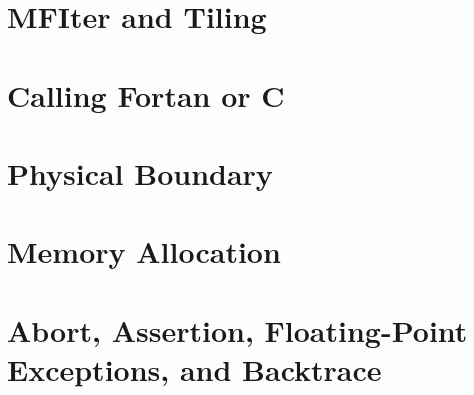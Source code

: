 
\section{MFIter and Tiling}

\section{Calling Fortan or C}

\section{Physical Boundary}

\section{Memory Allocation}

\section{Abort, Assertion, Floating-Point Exceptions, and Backtrace}
